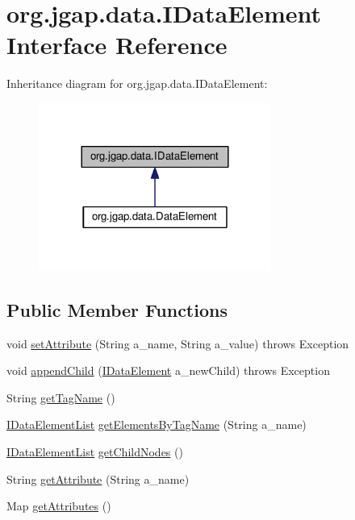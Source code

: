 \hypertarget{interfaceorg_1_1jgap_1_1data_1_1_i_data_element}{\section{org.\-jgap.\-data.\-I\-Data\-Element Interface Reference}
\label{interfaceorg_1_1jgap_1_1data_1_1_i_data_element}
}


Inheritance diagram for org.\-jgap.\-data.\-I\-Data\-Element\-:
\nopagebreak
\begin{figure}[H]
\begin{center}
\leavevmode
\includegraphics[width=216pt]{interfaceorg_1_1jgap_1_1data_1_1_i_data_element__inherit__graph}
\end{center}
\end{figure}
\subsection*{Public Member Functions}
\begin{DoxyCompactItemize}
\item 
void \hyperlink{interfaceorg_1_1jgap_1_1data_1_1_i_data_element_aba57d37bb026e2cce9d58fe9b26ef9cb}{set\-Attribute} (String a\-\_\-name, String a\-\_\-value)  throws Exception
\item 
void \hyperlink{interfaceorg_1_1jgap_1_1data_1_1_i_data_element_a67cbbe490c133f3cb8c61dc2b26a7759}{append\-Child} (\hyperlink{interfaceorg_1_1jgap_1_1data_1_1_i_data_element}{I\-Data\-Element} a\-\_\-new\-Child)  throws Exception
\item 
String \hyperlink{interfaceorg_1_1jgap_1_1data_1_1_i_data_element_adcb1961f896d1edab8ebef2b6994f560}{get\-Tag\-Name} ()
\item 
\hyperlink{interfaceorg_1_1jgap_1_1data_1_1_i_data_element_list}{I\-Data\-Element\-List} \hyperlink{interfaceorg_1_1jgap_1_1data_1_1_i_data_element_a411426fdcccf2c5519dae3b500fccdad}{get\-Elements\-By\-Tag\-Name} (String a\-\_\-name)
\item 
\hyperlink{interfaceorg_1_1jgap_1_1data_1_1_i_data_element_list}{I\-Data\-Element\-List} \hyperlink{interfaceorg_1_1jgap_1_1data_1_1_i_data_element_a71a62d3331ee777a468b8bbff00d9686}{get\-Child\-Nodes} ()
\item 
String \hyperlink{interfaceorg_1_1jgap_1_1data_1_1_i_data_element_acb5069db3c0928a00e2af63c322a5274}{get\-Attribute} (String a\-\_\-name)
\item 
Map \hyperlink{interfaceorg_1_1jgap_1_1data_1_1_i_data_element_aec5b4a4e075f19995059cbd79f98e527}{get\-Attributes} ()
\end{DoxyCompactItemize}
